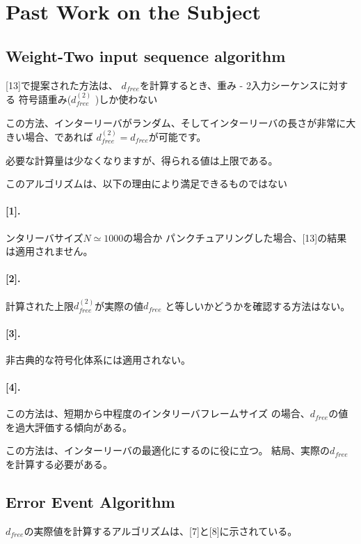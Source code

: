 \documentclass[20 pts]{article}
\begin{document}
\section{Past Work on the Subject}
\subsection{Weight-Two input sequence algorithm}

[13]で提案された方法は、 $d_{free}$を計算するとき、重み - 2入力シーケンスに対する
符号語重み($d^{(2)}_{free}$ )しか使わない

この方法、インターリーバがランダム、そしてインターリーバの長さが非常に大きい場合、であれば
$d^{(2)}_{free} =d_{free}$が可能です。

必要な計算量は少なくなりますが、得られる値は上限である。

このアルゴリズムは、以下の理由により満足できるものではない


\paragraph{[1].} ンタリーバサイズ$ N \simeq 1000 $の場合か
パンクチュアリングした場合、[13]の結果は適用されません。

\paragraph{[2].}計算された上限$d^{(2)}_{free}$が実際の値$d_{free}$
と等しいかどうかを確認する方法はない。

\paragraph{[3].}非古典的な符号化体系には適用されない。

\paragraph{[4].}この方法は、短期から中程度のインタリーバフレームサイズ
の場合、$d_ {free} $の値を過大評価する傾向がある。


この方法は、インターリーバの最適化にするのに役に立つ。
結局、実際の$d_{free}$を計算する必要がある。


\subsection{Error Event Algorithm}
$ d_ {free} $の実際値を計算するアルゴリズムは、[7]と[8]に示されている。
\end{document}
